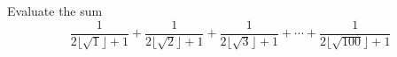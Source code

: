 Evaluate the sum \[ \dfrac {1}{2 \lfloor \sqrt {1} \rfloor + 1} + \dfrac {1}{2 \lfloor \sqrt {2} \rfloor + 1} + \dfrac {1}{2 \lfloor \sqrt {3} \rfloor + 1} + \cdots + \dfrac {1}{2 \lfloor \sqrt {100} \rfloor + 1} \]